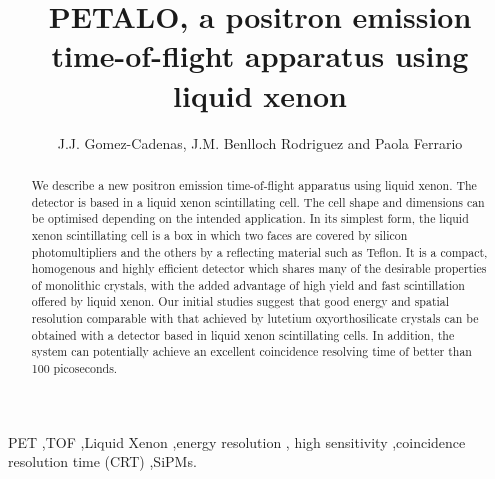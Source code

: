 \documentclass[review]{elsarticle}
\begin{document}
\begin{frontmatter}

\title{PETALO, a positron emission time-of-flight apparatus using liquid xenon}

\author{J.J. Gomez-Cadenas, J.M. Benlloch Rodriguez and Paola Ferrario}
\address{IFIC (U. Valencia/CSIC)}

%
%

\begin{abstract}
We describe a new positron emission time-of-flight apparatus using liquid xenon. The detector is based in a liquid xenon scintillating cell. The cell shape and dimensions can be optimised depending on the intended application. In its simplest form, the liquid xenon scintillating cell is a box in which two faces are covered by silicon photomultipliers and the others by a reflecting material such as Teflon. It is a compact, homogenous and highly efficient detector which shares many of the desirable properties of monolithic crystals, with the added advantage of high yield and fast scintillation offered by liquid xenon. Our initial studies suggest that good energy and spatial resolution comparable with that achieved by lutetium oxyorthosilicate crystals can be obtained with a detector based in liquid xenon scintillating cells. In addition, the system can potentially achieve an excellent coincidence resolving time of better than 100 picoseconds. 
\end{abstract}

\begin{keyword}
PET \sep TOF \sep Liquid Xenon \sep energy resolution \sep
 high sensitivity \sep coincidence resolution time (CRT) \sep SiPMs.
\end{keyword}

\end{frontmatter}


\end{document}
